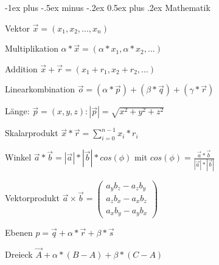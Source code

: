 \documentclass[landscape]{article}
\makeatletter
\renewcommand{\section}{\@startsection{section}{1}{0mm}%
                                {-1ex plus -.5ex minus -.2ex}%
                                {0.5ex plus .2ex}%
                                {\normalfont\large\bfseries}}
\makeatother
\begin{document}
\raggedright
\scriptsize
\begin{multicols}{3}
  
  \setlength{\premulticols}{1pt}
  \setlength{\postmulticols}{1pt}
  \setlength{\multicolsep}{1pt}
  \setlength{\columnsep}{2pt}
  
  \section{Mathematik}
  \begin{itemize*}
    \item Vektor $\vec{x}=(x_1,x_2,...,x_n)$
    \item Multiplikation $\alpha * \vec{x} = (\alpha *x_1, \alpha *x_2,...)$
    \item Addition $\vec{x}+\vec{r}=(x_1+r_1, x_2+r_2,...)$
    \item Linearkombination $\vec{o} = (\alpha * \vec{p})+(\beta *\vec{q})+(\gamma * \vec{r})$
    \item Länge: $\vec{p}=(x,y,z): |\vec{p}|=\sqrt{x^2+y^2+z^2}$
    \item Skalarprodukt $\vec{x}*\vec{r}=\sum_{i=0}^{n-1} x_i*r_i$
    \item Winkel $\vec{a}*\vec{b}=|\vec{a}|*|\vec{b}|*cos(\phi)$ mit $cos(\phi)=\frac{\vec{a}*\vec{b}}{|\vec{a}|*|\vec{b}|}$
    \item Vektorprodukt $\vec{a}\times\vec{b} = \begin{pmatrix} a_y b_z - a_z b_y \\ a_z b_x - a_x b_z \\ a_x b_y - a_y b_x \end{pmatrix}$
    \item Ebenen $p=\vec{q}+\alpha*\vec{r}+\beta * \vec{s}$
    \item Dreieck $\vec{A}+\alpha*(B-A)+\beta*(C-A)$
  \end{itemize*}
  

\end{multicols}
\end{document}
